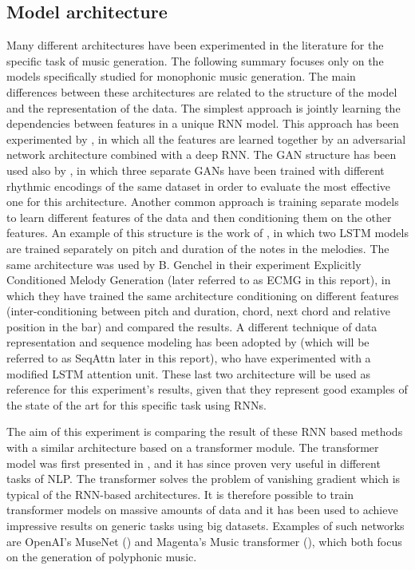 \documentclass{article}
\begin{document}
\subsection{Model architecture}
Many different architectures have been experimented in the literature for the specific task of music generation. The following summary focuses only on the models specifically studied for monophonic music generation. The main differences between these architectures are related to the structure of the model and the representation of the data. The simplest approach is jointly learning the dependencies between features in a unique RNN model. This approach has been experimented by \cite{C-RNN-GAN}, in which all the features are learned together by an adversarial network architecture combined with a deep RNN. The GAN structure has been used also by \cite{JazzGAN}, in which three separate GANs have been trained with different rhythmic encodings of the same dataset in order to evaluate the most effective one for this architecture. Another common approach is training separate models to learn different features of the data and then conditioning them on the other features. An example of this structure is the work of \cite{ACM}, in which two LSTM models are trained separately on pitch and duration of the notes in the melodies. The same architecture was used by B. Genchel \cite{ECMG} in their experiment Explicitly Conditioned Melody Generation (later referred to as ECMG in this report), in which they have trained the same architecture conditioning on different features (inter-conditioning between pitch and duration, chord, next chord and relative position in the bar) and compared the results. A different technique of data representation and sequence modeling has been adopted by \cite{seqAttn} (which will be referred to as SeqAttn later in this report), who have experimented with a modified LSTM attention unit. 
These last two architecture will be used as reference for this experiment's results, given that they represent good examples of the state of the art for this specific task using RNNs.

The aim of this experiment is comparing the result of these RNN based methods with a similar architecture based on a transformer module. The transformer model was first presented in \cite{AttnAllYouNeed}, and it has since proven very useful in different tasks of NLP. The transformer solves the problem of vanishing gradient which is typical of the RNN-based architectures. It is therefore possible to train transformer models on massive amounts of data and it has been used to achieve impressive results on generic tasks using big datasets. Examples of such networks are OpenAI's MuseNet (\cite{museNet}) and Magenta's Music transformer (\cite{MusicTransformer}), which both focus on the generation of polyphonic music.  
\end{document}
